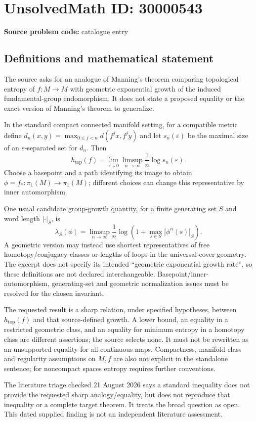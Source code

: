 \documentclass[11pt]{article}
\begin{document}
\section*{UnsolvedMath ID: 30000543}
\textbf{Source problem code:} catalogue entry
\subsection{Definitions and mathematical statement}
The source asks for an analogue of Manning's theorem comparing topological entropy of $f:M\to M$ with geometric exponential growth of the induced fundamental-group endomorphism. It does not state a proposed equality or the exact version of Manning's theorem to generalize.

In the standard compact connected manifold setting, for a compatible metric define $d_n(x,y)=\max_{0\leq j<n}d(f^jx,f^jy)$ and let $s_n(\varepsilon)$ be the maximal size of an $\varepsilon$-separated set for $d_n$. Then
\[
 h_{\mathrm{top}}(f)=\lim_{\varepsilon\downarrow0}
                       \limsup_{n\to\infty}\frac1n\log s_n(\varepsilon).
\]
Choose a basepoint and a path identifying its image to obtain $\phi=f_*:\pi_1(M)\to\pi_1(M)$; different choices can change this representative by inner automorphism.

One usual candidate group-growth quantity, for a finite generating set $S$ and word length $|\cdot|_S$, is
\[
 \lambda_S(\phi)=\limsup_{n\to\infty}\frac1n
      \log\!\left(1+\max_{s\in S}|\phi^n(s)|_S\right).
\]
A geometric version may instead use shortest representatives of free homotopy/conjugacy classes or lengths of loops in the universal-cover geometry. The excerpt does not specify its intended ``geometric exponential growth rate'', so these definitions are not declared interchangeable. Basepoint/inner-automorphism, generating-set and geometric normalization issues must be resolved for the chosen invariant.

The requested result is a sharp relation, under specified hypotheses, between $h_{\mathrm{top}}(f)$ and that source-defined growth. A lower bound, an equality in a restricted geometric class, and an equality for minimum entropy in a homotopy class are different assertions; the source selects none. It must not be rewritten as an unsupported equality for all continuous maps. Compactness, manifold class and regularity assumptions on $M,f$ are also not explicit in the standalone sentence; for noncompact spaces entropy requires further conventions.

The literature triage checked 21 August 2026 says a standard inequality does not provide the requested sharp analogy/equality, but does not reproduce that inequality or a complete target theorem. It treats the broad question as open. This dated supplied finding is not an independent literature assessment.
\end{document}
